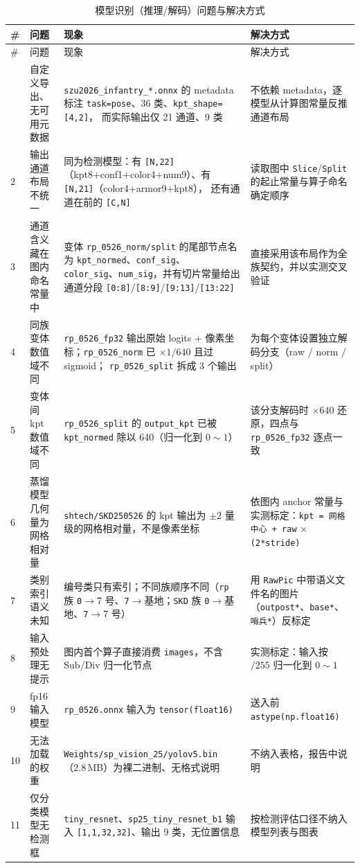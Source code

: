 \documentclass[11pt,a4paper]{ctexart}
\newcommand{\code}[1]{\texttt{\small #1}}
\begin{document}
\begin{longtable}{@{}p{0.6cm} p{4.6cm} p{5.6cm} p{4.2cm}@{}}
\caption{模型识别（推理/解码）问题与解决方式}\label{tab:problem}\\
\toprule
\# & 问题 & 现象 & 解决方式\\
\midrule
\endfirsthead
\toprule
\# & 问题 & 现象 & 解决方式\\
\midrule
\endhead
\bottomrule
\endfoot
1 & 自定义导出、无可用元数据 &
\code{szu2026\_infantry\_*.onnx} 的 metadata 标注 \code{task=pose}、36 类、\code{kpt\_shape=[4,2]}，
而实际输出仅 21 通道、9 类 & 不依赖 metadata，逐模型从计算图常量反推通道布局 \\
\hline
2 & 输出通道布局不统一 &
同为检测模型：有 \code{[N,22]}（kpt8+conf1+color4+num9）、有 \code{[N,21]}（color4+armor9+kpt8），
还有通道在前的 \code{[C,N]} & 读取图中 \code{Slice}/\code{Split} 的起止常量与算子命名确定顺序 \\
\hline
3 & 通道含义藏在图内命名常量中 &
变体 \code{rp\_0526\_norm/split} 的尾部节点名为 \code{kpt\_normed}、\code{conf\_sig}、
\code{color\_sig}、\code{num\_sig}，并有切片常量给出通道分段 \code{[0:8]}/\code{[8:9]}/\code{[9:13]}/\code{[13:22]} &
直接采用该布局作为全族契约，并以实测交叉验证 \\
\hline
4 & 同族变体数值域不同 &
\code{rp\_0526\_fp32} 输出原始 logits + 像素坐标；\code{rp\_0526\_norm} 已 $\times 1/640$ 且过 sigmoid；
\code{rp\_0526\_split} 拆成 3 个输出 & 为每个变体设置独立解码分支（raw / norm / split） \\
\hline
5 & 变体间 kpt 数值域不同 &
\code{rp\_0526\_split} 的 \code{output\_kpt} 已被 \code{kpt\_normed} 除以 640（归一化到 $0\sim1$）&
该分支解码时 $\times 640$ 还原，四点与 \code{rp\_0526\_fp32} 逐点一致 \\
\hline
6 & 蒸馏模型几何量为网格相对量 &
\code{shtech/SKD250526} 的 kpt 输出为 $\pm 2$ 量级的网格相对量，不是像素坐标 &
依图内 anchor 常量与实测标定：\code{kpt = 网格中心 + raw} $\times$ \code{(2*stride)} \\
\hline
7 & 类别索引语义未知 &
编号类只有索引；不同族顺序不同（\code{rp} 族 \code{0}$\to$7 号、\code{7}$\to$基地；\code{SKD} 族 \code{0}$\to$基地、\code{7}$\to$7 号）&
用 \code{RawPic} 中带语义文件名的图片（\code{outpost*}、\code{*base*}、\code{哨兵*}）反标定 \\
\hline
8 & 输入预处理无提示 &
图内首个算子直接消费 \code{images}，不含 Sub/Div 归一化节点 & 实测标定：输入按 $/255$ 归一化到 $0\sim1$ \\
\hline
9 & fp16 输入模型 & \code{rp\_0526.onnx} 输入为 \code{tensor(float16)} & 送入前 \code{astype(np.float16)} \\
\hline
10 & 无法加载的权重 & \code{Weights/sp\_vision\_25/yolov5.bin}（2.8\,MB）为裸二进制、无格式说明 &
不纳入表格，报告中说明 \\
\hline
11 & 仅分类模型无检测框 & \code{tiny\_resnet}、\code{sp25\_tiny\_resnet\_b1} 输入 \code{[1,1,32,32]}、输出 9 类，无位置信息 &
按检测评估口径不纳入模型列表与图表 \\

\end{longtable}
\end{document}
